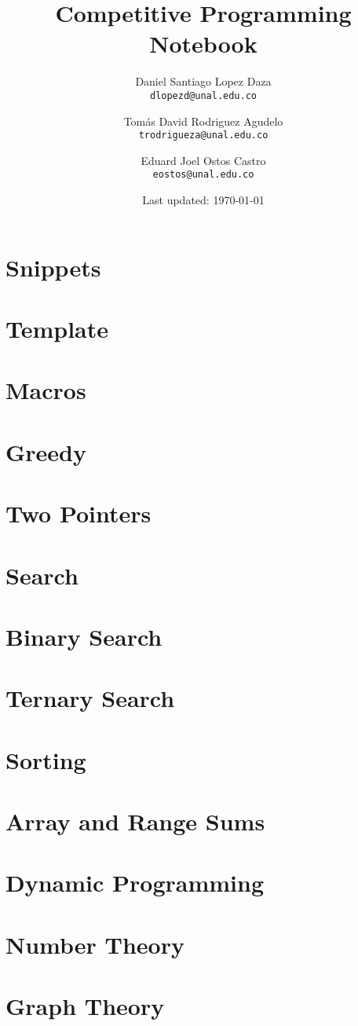 \documentclass[landscape, 9pt]{article}
\title{Competitive Programming Notebook} %
\author{
 Daniel Santiago Lopez Daza\\
   \texttt{dlopezd@unal.edu.co}
  \and
  Tomás David Rodriguez Agudelo\\
  \texttt{trodrigueza@unal.edu.co}
  \and
  Eduard Joel Ostos Castro\\
    \texttt{eostos@unal.edu.co}  
}
\date{Last updated: \today}
\begin{document}
\maketitle
\newpage
\tableofcontents
\newpage
\begin{multicols}{2}
\section{Snippets}
\newpage
\section{Template}
\newpage
\section{Macros}


\newpage
\section{Greedy}
\newpage
\section{Two Pointers}
\newpage
\section{Search}
\newpage
\section*{Binary Search}
\newpage
\section*{Ternary Search}
\newpage
\section{Sorting}
\newpage
\section{Array and Range Sums}
\newpage
\section{Dynamic Programming}
\newpage
\section{Number Theory}
\newpage
\section{Graph Theory}
\end{multicols}
\end{document}
